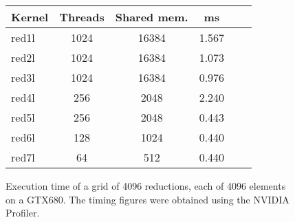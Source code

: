 \begin{figure} 
\begin{small}
\centering
\begin{tabular}{| l | c | c | c | c | r | }
\hline 
  Kernel & Threads & Shared mem. & ms \\ \hline 
  red1l & 1024 & 16384 & 1.567   \\ \hline
  red2l & 1024 & 16384 & 1.073   \\ \hline
  red3l & 1024 & 16384 & 0.976   \\ \hline
  red4l & 256 & 2048  &  2.240   \\ \hline
  red5l & 256 & 2048  &  0.443   \\ \hline
  red6l & 128 & 1024  &  0.440   \\ \hline
  red7l & 64 & 512  &    0.440   \\ \hline
\end{tabular}
\caption{ Execution time of a grid of 4096 reductions, each of 4096 elements on 
a GTX680. The timing figures were obtained using the NVIDIA Profiler.}
\label{fig:reducetablel} 
\end{small} 
\end{figure} 









